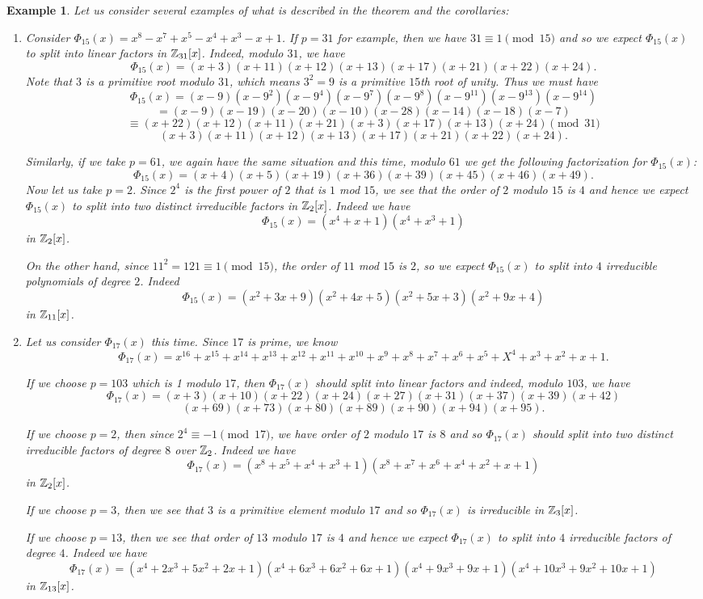 \documentclass[12pt]{article}
\theoremstyle{plain}
\newtheorem{example}{Example}
\theoremstyle{definition}
\theoremstyle{remark}
\begin{document}
\begin{example}
Let us consider several examples of what is described in the theorem and the corollaries:
\begin{enumerate}
    \item Consider $\Phi_{15}(x) = x^8-x^7+x^5-x^4+x^3-x+1$.
    If $p=31$ for example, then we have $31\equiv 1\pmod{15}$ and so we expect $\Phi_{15}(x)$ to split into linear factors in $\mathbb{Z}_{31}[x]$. Indeed, modulo $31$, we have
    $$\Phi_{15}(x) = (x+3)(x+11)(x+12)(x+13)(x+17)(x+21)(x+22)(x+24). $$
    Note that $3$ is a primitive root modulo $31$, which means $3^2=9$ is a primitive $15$th root of unity. Thus we must have
    $$\Phi_{15}(x) = (x-9)(x-9^2)(x-9^4)(x-9^7)(x-9^8)(x-9^{11})(x-9^{13})(x-9^{14})$$
    $$=(x-9)(x-19)(x-20)(x-10)(x-28)(x-14)(x-18)(x-7)$$
    $$\equiv (x+22)(x+12)(x+11)(x+21)(x+3)(x+17)(x+13)(x+24) \pmod{31}$$
    $$(x+3)(x+11)(x+12)(x+13)(x+17)(x+21)(x+22)(x+24).$$

    Similarly, if we take $p=61$, we again have the same situation and this time, modulo $61$ we get the following factorization for $\Phi_{15}(x)$:
    $$\Phi_{15}(x)=(x+4)(x+5)(x+19)(x+36)(x+39)(x+45)(x+46)(x+49).$$
Now let us take $p=2$. Since $2^4$ is the first power of $2$ that is $1$ mod $15$, we see that the order of $2$ modulo $15$ is $4$ and hence we expect $\Phi_{15}(x)$ to split into two distinct irreducible factors in $\mathbb{Z}_2[x]$. Indeed we have
$$\Phi_{15}(x) = (x^4+x+1)(x^4+x^3+1)$$ in $\mathbb{Z}_2[x]$.

On the other hand, since $11^2=121\equiv 1 \pmod{15}$, the order of $11$ mod $15$ is $2$, so we expect $\Phi_{15}(x)$ to split into $4$ irreducible polynomials of degree $2$. Indeed
$$\Phi_{15}(x) = (x^2+3x+9)(x^2+4x+5)(x^2+5x+3)(x^2+9x+4)$$
in $\mathbb{Z}_{11}[x]$.

\item Let us consider $\Phi_{17}(x)$ this time. Since $17$ is prime, we know
$$\Phi_{17}(x) = x^{16}+x^{15}+x^{14}+x^{13}+x^{12}+x^{11}+x^{10}+x^{9}+x^8+x^7+x^6+x^5+X^4+x^3+x^2+x+1.$$

If we choose $p=103$ which is 1 modulo $17$, then $\Phi_{17}(x)$ should split into linear factors and indeed, modulo $103$, we have
$$\Phi_{17}(x) = (x+3)(x+10)(x+22)(x+24)(x+27)(x+31)(x+37)(x+39)(x+42)$$
$$(x+69)(x+73)(x+80)(x+89)(x+90)(x+94)(x+95).$$

If we choose $p=2$, then since $2^4\equiv-1\pmod{17}$, we have order of $2$ modulo $17$ is $8$ and so $\Phi_{17}(x)$ should split into two distinct irreducible factors of degree $8$ over $\mathbb{Z}_2$. Indeed we have
$$\Phi_{17}(x) = (x^8+x^5+x^4+x^3+1)(x^8+x^7+x^6+x^4+x^2+x+1)$$
in $\mathbb{Z}_2[x]$.

If we choose $p=3$, then we see that $3$ is a primitive element modulo $17$ and so $\Phi_{17}(x)$ is irreducible in $\mathbb{Z}_{3}[x]$.

If we choose $p=13$, then we see that order of $13$ modulo $17$ is $4$ and hence we expect $\Phi_{17}(x)$ to split into $4$ irreducible factors of degree $4$. Indeed we have
$$\Phi_{17}(x) = (x^4+2x^3+5x^2+2x+1)(x^4+6x^3+6x^2+6x+1)(x^4+9x^3+9x+1)(x^4+10x^3+9x^2+10x+1)$$ in $\mathbb{Z}_{13}[x]$.
\end{enumerate}
\end{example}
\end{document}
